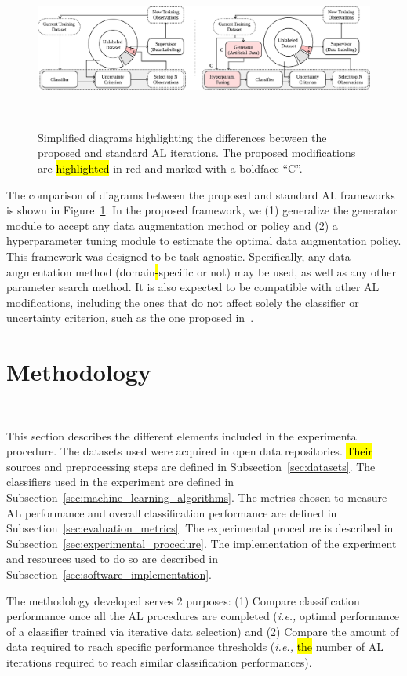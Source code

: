 \documentclass[preprint, 12pt]{elsarticle}
\begin{document}
\begin{figure}[H]
	\centering
	\includegraphics[width=\linewidth]{../analysis/al_comparison}
    \caption{%
        Simplified diagrams highlighting the differences between the proposed
        and standard AL iterations. The proposed modifications are \hl{highlighted}
        in red and marked with a boldface ``C''.
    }~\label{fig:al_comparison}
\end{figure}

The comparison of diagrams between the proposed and standard AL frameworks is
shown in Figure~\ref{fig:al_comparison}. In the proposed framework, we (1)
generalize the generator module to accept any data augmentation method or
policy and (2) a hyperparameter tuning module to estimate the optimal data
augmentation policy. This framework was designed to be task-agnostic.
Specifically, any data augmentation method (domain\hl{-}specific or not) may
be used, as well as any other parameter search method. It is also expected to
be compatible with other AL modifications, including the ones that do not
affect solely the classifier or uncertainty criterion, such as the one
proposed in~\cite{Yoo2019}.
 
\section{Methodology}~\label{sec:methodology}

This section describes the different elements included in the experimental
procedure. The datasets used were acquired in open data repositories.
\hl{Their} sources and preprocessing steps are defined in
Subsection~\ref{sec:datasets}. The classifiers used in the experiment are
defined in Subsection~\ref{sec:machine_learning_algorithms}. The metrics
chosen to measure AL performance and overall classification performance are
defined in Subsection~\ref{sec:evaluation_metrics}. The experimental procedure
is described in Subsection~\ref{sec:experimental_procedure}. The
implementation of the experiment and resources used to do so are described in
Subsection~\ref{sec:software_implementation}.

The methodology developed serves 2 purposes: (1) Compare classification
performance once all the AL procedures are completed (\textit{i.e.,} optimal
performance of a classifier trained via iterative data selection) and (2)
Compare the amount of data required to reach specific performance thresholds
(\textit{i.e.,} \hl{the} number of AL iterations required to reach similar
classification performances).
 
\end{document}
